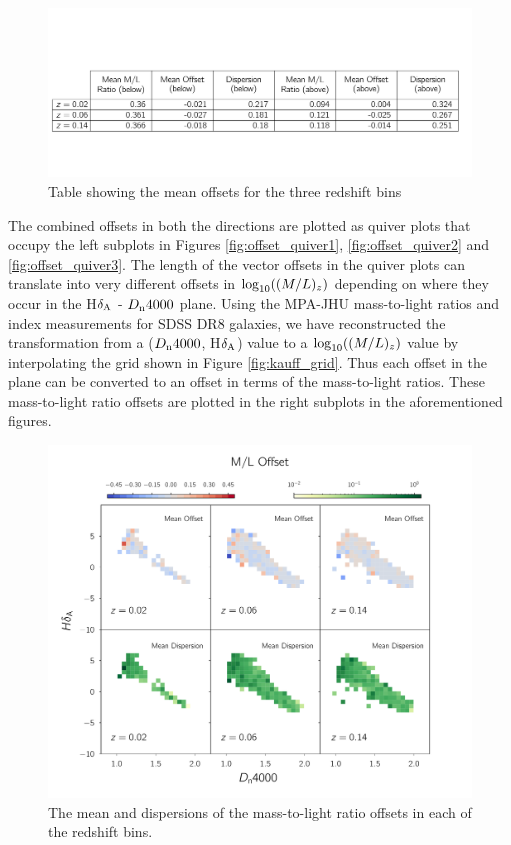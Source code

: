 \begin{figure}
\includegraphics[width=\textwidth]{figures/table.pdf}
\caption[Table showing the mean offsets for the three redshift bins.]
{Table showing the mean offsets for the three redshift bins
\label{tab: mean_offset_table}}
\end{figure}

The combined offsets in both the directions are plotted as quiver 
plots that occupy the left subplots in Figures \ref{fig:offset_quiver1}, 
\ref{fig:offset_quiver2} and \ref{fig:offset_quiver3}. The length of 
the vector offsets in the quiver plots can translate into very 
different offsets in ${\rm log}_{10}((M/L)_{z})$ depending on 
where they occur in the H$\delta_{\rm A}$ - $D_{\rm n}4000$ plane. 
Using the MPA-JHU mass-to-light ratios and index measurements 
for SDSS DR8 galaxies, we have reconstructed the transformation 
from a ($D_{\rm n}4000$, H$\delta_{\rm A}$) value to a 
${\rm log}_{10}((M/L)_{z})$ value by interpolating the grid 
shown in Figure \ref{fig:kauff_grid}. Thus each offset in the 
plane can be converted to an offset in terms of the 
mass-to-light ratios. These mass-to-light ratio offsets are 
plotted in the right subplots in the aforementioned figures.\\ 
\begin{figure}
\includegraphics[width=\textwidth]{figures/ml_offset_plot.pdf}
\caption[ The mean and dispersion of the mass-to-light ratio 
offsets in each of the redshift bins.]{The mean and 
dispersions of the mass-to-light ratio offsets in each
 of the redshift bins.
\label{dispersion_plot}}
\end{figure}

